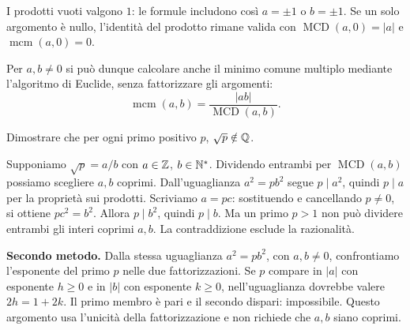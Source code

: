 I prodotti vuoti valgono $1$: le formule includono così $a=\pm1$ o $b=\pm1$. Se un solo argomento è nullo, l'identità del prodotto rimane valida con $\operatorname{MCD}(a,0)=|a|$ e $\operatorname{mcm}(a,0)=0$.

Per $a,b\ne0$ si può dunque calcolare anche il minimo comune multiplo mediante l'algoritmo di Euclide, senza fattorizzare gli argomenti:
\[
\operatorname{mcm}(a,b)=\frac{|ab|}{\operatorname{MCD}(a,b)}.
\]

\begin{esercizio}
Dimostrare che per ogni primo positivo $p$, $\sqrt p\notin\mathbb{Q}$.
\end{esercizio}
\begin{svolgimento}
Supponiamo $\sqrt p=a/b$ con $a\in\mathbb{Z}$, $b\in\mathbb{N}^*$. Dividendo entrambi per $\operatorname{MCD}(a,b)$ possiamo scegliere $a,b$ coprimi. Dall'uguaglianza $a^2=pb^2$ segue $p\mid a^2$, quindi $p\mid a$ per la proprietà sui prodotti. Scriviamo $a=pc$: sostituendo e cancellando $p\ne0$, si ottiene $pc^2=b^2$. Allora $p\mid b^2$, quindi $p\mid b$. Ma un primo $p>1$ non può dividere entrambi gli interi coprimi $a,b$. La contraddizione esclude la razionalità.

\textbf{Secondo metodo.} Dalla stessa uguaglianza $a^2=pb^2$, con $a,b\ne0$, confrontiamo l'esponente del primo $p$ nelle due fattorizzazioni. Se $p$ compare in $|a|$ con esponente $h\ge0$ e in $|b|$ con esponente $k\ge0$, nell'uguaglianza dovrebbe valere $2h=1+2k$. Il primo membro è pari e il secondo dispari: impossibile. Questo argomento usa l'unicità della fattorizzazione e non richiede che $a,b$ siano coprimi.
\end{svolgimento}
